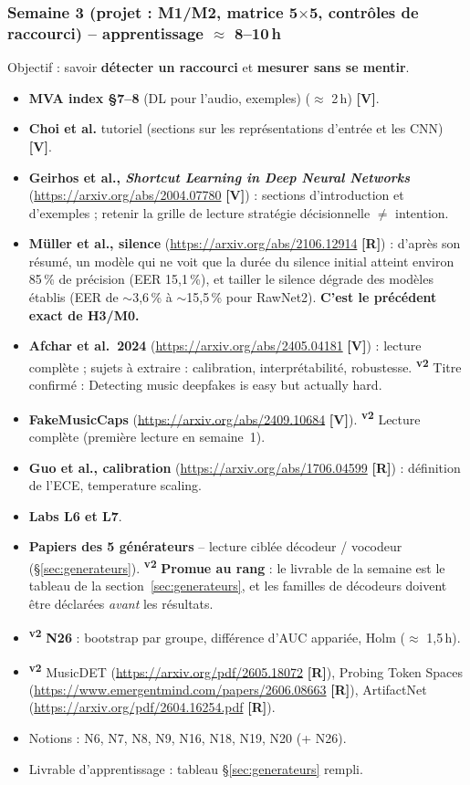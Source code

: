 \documentclass[11pt,a4paper]{article}
\providecommand{\og}{\guillemotleft\nobreakspace}%
\providecommand{\fg}{\nobreakspace\guillemotright}}
\newcommand{\sS}{\ding{72}}   %
\newcommand{\sO}{\ding{73}}   %
\newcommand{\vtwo}{\textsuperscript{\textcolor{orange!80!black}{\textbf{v2}}}}
\newcommand{\lV}{\textbf{\textcolor{green!45!black}{[V]}}}
\newcommand{\lR}{\textbf{\textcolor{orange!80!black}{[R]}}}
\begin{document}
\subsubsection{Semaine 3 (projet : M1/M2, matrice 5$\times$5, contrôles de raccourci) -- apprentissage $\approx$ 8--10\,h}
Objectif : savoir \textbf{détecter un raccourci} et \textbf{mesurer sans se mentir}.
\begin{itemize}
\item \textbf{\sS} \textbf{MVA index §7--8} (DL pour l'audio, exemples) ($\approx$ 2\,h) \lV.
\item \textbf{\sS} \textbf{Choi et al.} tutoriel (sections sur les représentations d'entrée et les CNN) \lV.
\item \textbf{\sS} \textbf{Geirhos et al., \emph{Shortcut Learning in Deep Neural Networks}} (\url{https://arxiv.org/abs/2004.07780} \lV) : sections d'introduction et d'exemples ; retenir la grille de lecture \og{}stratégie décisionnelle $\neq$ intention\fg{}.
\item \textbf{\sS} \textbf{Müller et al., silence} (\url{https://arxiv.org/abs/2106.12914} \lR) : d'après son résumé, un modèle qui ne voit que la durée du silence initial atteint environ 85\,\% de précision (EER 15,1\,\%), et tailler le silence dégrade des modèles établis (EER de $\sim$3,6\,\% à $\sim$15,5\,\% pour RawNet2). \textbf{C'est le précédent exact de H3/M0.}
\item \textbf{\sS} \textbf{Afchar et al.\ 2024} (\url{https://arxiv.org/abs/2405.04181} \lV) : lecture complète ; sujets à extraire : calibration, interprétabilité, robustesse. \vtwo{} Titre confirmé : \og{}Detecting music deepfakes is easy but actually hard\fg{}.
\item \textbf{\sS} \textbf{FakeMusicCaps} (\url{https://arxiv.org/abs/2409.10684} \lV). \vtwo{} Lecture complète (première lecture en semaine~1).
\item \textbf{\sS} \textbf{Guo et al., calibration} (\url{https://arxiv.org/abs/1706.04599} \lR) : définition de l'ECE, temperature scaling.
\item \textbf{\sS} \textbf{Labs L6 et L7}.
\item \textbf{\sO} \textbf{Papiers des 5 générateurs} -- lecture ciblée \og{}décodeur / vocodeur\fg{} (§\ref{sec:generateurs}). \vtwo{} \textbf{Promue au rang \sS} : le livrable de la semaine est le tableau de la section~\ref{sec:generateurs}, et les familles de décodeurs doivent être déclarées \emph{avant} les résultats.
\item \vtwo{} \textbf{\sS} \textbf{N26} : bootstrap par groupe, différence d'AUC appariée, Holm ($\approx$ 1,5\,h).
\item \vtwo{} \textbf{\sO} MusicDET (\url{https://arxiv.org/pdf/2605.18072} \lR), \og{}Probing Token Spaces\fg{} (\url{https://www.emergentmind.com/papers/2606.08663} \lR), ArtifactNet (\url{https://arxiv.org/pdf/2604.16254.pdf} \lR).
\item Notions : N6, N7, N8, N9, N16, N18, N19, N20 (+ N26).
\item Livrable d'apprentissage : tableau §\ref{sec:generateurs} rempli.
\end{itemize}
\end{document}
